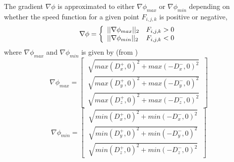 The gradient \(\nabla \phi\) is approximated to either \(\nabla \phi_{max}\) or \(\nabla \phi_{min}\) depending on whether the speed function for a given point \(F_{i,j,k}\) is positive or negative, 
\begin{equation}
\nabla \phi = \left\{
\begin{array}{l l}
||\nabla \phi_{max}||_2 & F_{i,j,k}>0 \\
||\nabla \phi_{min}||_2 & F_{i,j,k}<0
\end{array} \right.
\end{equation}
where \(\nabla \phi_{max}\) and \(\nabla \phi_{min}\) is given by (from \cite{lefohn04})
\begin{equation}
\nabla \phi_{max} = \begin{bmatrix}
\: \sqrt{max(D_x^+,0)^2 + max(-D_x^-,0)^2} \: \\[1.5em]
\: \sqrt{max(D_y^+,0)^2 + max(-D_y^-,0)^2} \: \\[1.5em]
\: \sqrt{max(D_z^+,0)^2 + max(-D_z^-,0)^2} \: 
\end{bmatrix} 
\end{equation}
\newline
\begin{equation}
\nabla \phi_{min} = \begin{bmatrix}
\: \sqrt{min(D_x^+,0)^2 + min(-D_x^-,0)^2} \: \\[1.5em]
\: \sqrt{min(D_y^+,0)^2 + min(-D_y^-,0)^2} \: \\[1.5em]
\: \sqrt{min(D_z^+,0)^2 + min(-D_z^-,0)^2} \: 
\end{bmatrix} 
\end{equation}

